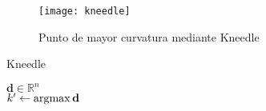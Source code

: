 				\begin{figure}[!h]
					\centering
					\texttt{[image: kneedle]}
					\caption{Punto de mayor curvatura mediante Kneedle}
					\label{fig:kneedle}
				\end{figure}
				
				\begin{algorithm}
					\DontPrintSemicolon
					
					\caption{Kneedle}
					\label{algo:kneedle}
					
					$\textbf{d} \in \mathbb{R}^n$\\
					$k' \gets \displaystyle\operatorname*{\arg\!\max} \textbf{d}$
				\end{algorithm}